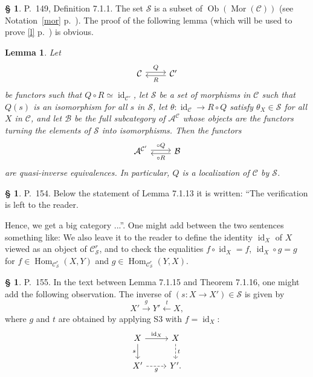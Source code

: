 \documentclass[12pt]{article}
\newtheorem{lem}[thm]{Lemma}
\theoremstyle{remark}
\theoremstyle{definition}
\newtheorem{s}[thm]{\S}
\newcommand{\cc}{\mathcal}
\newcommand{\A}{\mathcal A}
\newcommand{\B}{\mathcal B}
\newcommand{\C}{\mathcal C}
\DeclareMathOperator{\id}{id}
\DeclareMathOperator{\Hom}{Hom}%
\DeclareMathOperator{\Mor}{Mor}
\DeclareMathOperator{\Ob}{Ob}
\begin{document}
%
%
\begin{s} 
P.~149, Definition 7.1.1. The set $\cc S$ is a subset of $\Ob(\Mor(\C))$ (see Notation~\ref{mor} p.~\pageref{mor}). The proof of the following lemma (which will be used to prove \eqref{l} p.~\pageref{l}) is obvious. 
%
\begin{lem}\label{711}
%
Let 
$$
\begin{tikzcd}\C\ar[yshift=.5ex]{r}{Q}&\C'\ar[yshift=-.4ex]{l}{R}\end{tikzcd}
$$ 
be functors such that $Q\circ R\simeq\id_{\C'}$, let $\cc S$ be a set of morphisms in $\C$ such that $Q(s)$ is an isomorphism for all $s$ in $\cc S$, let $\theta:\id_\C\to R\circ Q$ satisfy $\theta_X\in\cc S$ for all $X$ in $\C$, and let $\B$ be the full subcategory of $\A^\C$ whose objects are the functors turning the elements of $\cc S$ into isomorphisms. Then the functors
$$
\begin{tikzcd}\A^{\C'}\ar[yshift=.4ex]{r}{\circ Q}&\B\ar[yshift=-.5ex]{l}{\circ R}\end{tikzcd}
$$
are quasi-inverse equivalences. In particular, $Q$ is a localization of $\C$ by $\cc S$.
%
\end{lem}

\end{s}
%
%
\begin{s} 
P.~154. Below the statement of Lemma 7.1.13 it is written: ``The verification is left to the reader.

Hence, we get a big category ...''. One might add between the two sentences something like: We also leave it to the reader to define the identity $\id_X$ of $X$ viewed as an object of $\C^r_{\mathcal S}$, and to check the equalities $f\circ\id_X=f$, $\id_X\circ g=g$ for $f\in\Hom_{\C^r_{\mathcal S}}(X,Y)$ and $g\in\Hom_{\C^r_{\mathcal S}}(Y,X)$.
\end{s}
%
%
\begin{s} 
P.~155. In the text between Lemma 7.1.15 and Theorem 7.1.16, one might add the following observation. The inverse of $(s:X\to X')\in\mathcal S$ is given by 
$$
X'\overset{g}{\to}Y'\overset{t}{\leftarrow}X,
$$
where $g$ and $t$ are obtained by applying S3 with $f=\id_X$:
$$
\begin{tikzcd}
X\ar{r}{\id_X}\ar{d}[swap]{s}&X\ar[dashed]{d}{t}\\ X'\ar[dashed]{r}[swap]{g}&Y'.
\end{tikzcd}
$$
\end{s}
%
%
\end{document}
